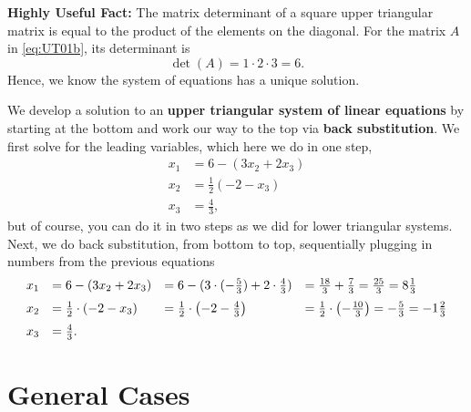 \begin{tcolorbox}
\textbf{Highly Useful Fact:} The matrix determinant of a square upper triangular matrix is equal to the product of the elements on the diagonal. For the matrix $A$ in \eqref{eq:UT01b}, its determinant is 
\begin{equation}
   \det(A) = 1 \cdot 2 \cdot 3 = 6. 
\end{equation}
Hence, we know the system of equations has a unique solution.
\end{tcolorbox}

\begin{tcolorbox}[sharp corners, colback=green!30, colframe=green!80!blue, title=\textbf{\Large Back Substitution}]
We develop a solution to an \textbf{upper triangular system of linear equations} by starting at the bottom and work our way to the top via \textbf{back substitution}. We first solve for the leading variables, which here we do in one step,
\begin{equation}
    \begin{aligned}
         x_1  &=6- (3x_2 + 2 x_3) \\
      x_2 &= \frac{1}{2} \left( -2-x_3 \right) \\
      x_3 &= \frac{4}{3},
    \end{aligned}
\end{equation}
but of course, you can do it in two steps as we did for lower triangular systems.
Next, we do back substitution, from bottom to top, sequentially plugging in numbers from the previous equations
\begin{equation}
    \begin{array}{llll}
         x_1  &=6- (3x_2 + 2 x_3) &= 6 -( 3\cdot(-\frac{5}{3}) + 2 \cdot \frac{4}{3}) &=\frac{18}{3}+\frac{7}{3} = \frac{25}{3}=8 \frac{1}{3} \medskip \\
        x_2 &= \frac{1}{2} \cdot \left( -2-x_3 \right) &=  \frac{1}{2} \cdot  \left( -2-\frac{4}{3} \right) &= \frac{1}{2} \cdot  \left(-\frac{10}{3}\right) = -\frac{5}{3} = -1 \frac{2}{3}\medskip \\
      x_3 &= \frac{4}{3}.
    \end{array}
\end{equation}
\end{tcolorbox}


\section{General Cases}


